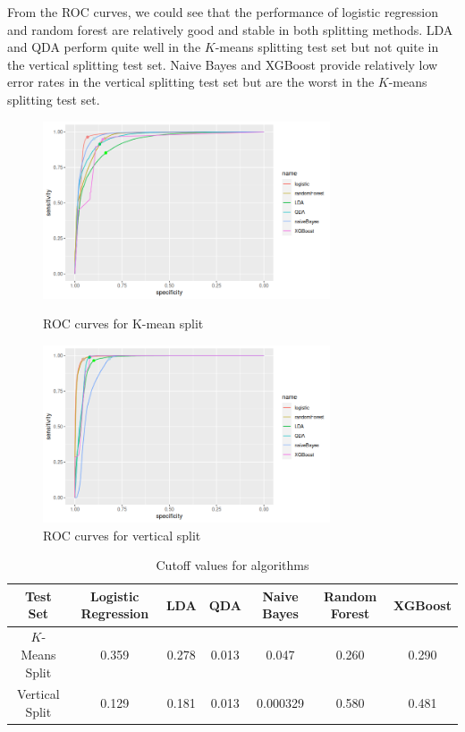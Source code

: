 \documentclass[11pt]{article}
\theoremstyle{definition}
\begin{document}
From the ROC curves, we could see that the performance of logistic regression and random forest are relatively good and stable in both splitting methods. LDA and QDA perform quite well in the $K$-means splitting test set but not quite in the vertical splitting test set. Naive Bayes and XGBoost provide relatively low error rates in the vertical splitting test set but are the worst in the $K$-means splitting test set.

\begin{figure}[h]
\begin{minipage}[t]{0.5\textwidth}
\centering
\includegraphics[width=8.5cm]{figures/3bK.png}
\caption{ROC curves for K-mean split}
\label{3bK}
\end{minipage}
\begin{minipage}[t]{0.5\textwidth}
\centering
\includegraphics[width=8.5cm]{figures/3bV.png}
\caption{ROC curves for vertical split}
\label{3bV}
\end{minipage}
\end{figure}
\FloatBarrier 

\begin{table}[h]
    \centering
    \begin{tabular}{c||c|c|c|c|c|c}
    Test Set & Logistic Regression
    & LDA
    & QDA & Naive Bayes & Random Forest & XGBoost \\
    \hline
    \hline
    $K$-Means Split
    & 0.359 & 0.278 & 0.013 & 0.047 & 0.260 & 0.290\\
    \hline
    Vertical Split
    & 0.129
    & 0.181 & 0.013 & 0.000329 & 0.580 & 0.481

    \end{tabular}
    \caption{Cutoff values for algorithms}
    \label{threshold}
\end{table}
\FloatBarrier
\end{document}
